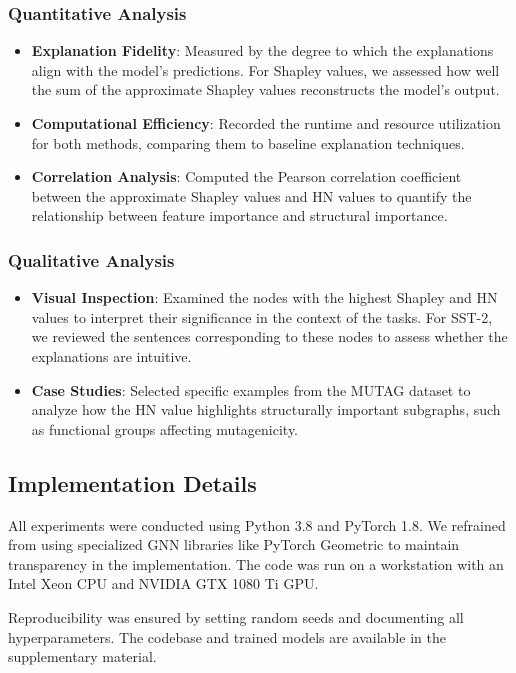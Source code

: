 \documentclass{article}
\begin{document}
\subsubsection{Quantitative Analysis}
\begin{itemize}
    \item \textbf{Explanation Fidelity}: Measured by the degree to which the explanations align with the model's predictions. For Shapley values, we assessed how well the sum of the approximate Shapley values reconstructs the model's output.
    \item \textbf{Computational Efficiency}: Recorded the runtime and resource utilization for both methods, comparing them to baseline explanation techniques.
    \item \textbf{Correlation Analysis}: Computed the Pearson correlation coefficient between the approximate Shapley values and HN values to quantify the relationship between feature importance and structural importance.
\end{itemize}

\subsubsection{Qualitative Analysis}
\begin{itemize}
    \item \textbf{Visual Inspection}: Examined the nodes with the highest Shapley and HN values to interpret their significance in the context of the tasks. For SST-2, we reviewed the sentences corresponding to these nodes to assess whether the explanations are intuitive.
    \item \textbf{Case Studies}: Selected specific examples from the MUTAG dataset to analyze how the HN value highlights structurally important subgraphs, such as functional groups affecting mutagenicity.
\end{itemize}

\subsection{Implementation Details}
All experiments were conducted using Python 3.8 and PyTorch 1.8. We refrained from using specialized GNN libraries like PyTorch Geometric to maintain transparency in the implementation. The code was run on a workstation with an Intel Xeon CPU and NVIDIA GTX 1080 Ti GPU.

Reproducibility was ensured by setting random seeds and documenting all hyperparameters. The codebase and trained models are available in the supplementary material.
\end{document}
